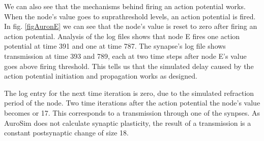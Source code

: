 	We can also see that the mechanisms behind firing an action potential works. 
	When the node's value goes to suprathreshold levels, an action potential is fired. %
	In fig. \ref{figAuronE} we can see that the node's value is reset to zero after firing an action potential.
	Analysis of the log files shows that node E fires one action potential at time 391 and one at time 787.
	The synapse's log file shows transmission at time 393 and 789, each at two time steps after node E's value goes above firing threshold.
	This tells us that the simulated delay caused by the action potential initiation and propagation works as designed.
	
	The log entry for the next time iteration is zero, due to the simulated refraction period of the node.
	Two time iterations after the action potential the node's value becomes or 17. %
	This corresponds to a transmission through one of the synpses.
	As AuroSim does not calculate synaptic plasticity, the result of a transmission is a constant postsynaptic change of size 18.


